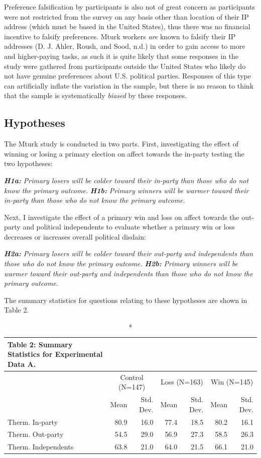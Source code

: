 \documentclass[
]{article}
\begin{document}
Preference falsification by participants is also not of great concern as participants were not restricted from the survey on any basis other than location of their IP address (which must be based in the United States), thus there was no financial incentive to falsify preferences. Mturk workers \emph{are} known to falsify their IP addresses (D. J. Ahler, Roush, and Sood, n.d.) in order to gain access to more and higher-paying tasks, as such it is quite likely that some responses in the study were gathered from participants outside the United States who likely do not have genuine preferences about U.S. political parties. Responses of this type can artificially inflate the variation in the sample, but there is no reason to think that the sample is systematically \emph{biased} by these responses.

\hypertarget{hypotheses}{%
\subsection{Hypotheses}\label{hypotheses}}

The Mturk study is conducted in two parts. First, investigating the effect of winning or losing a primary election on affect towards the in-party testing the two hypotheses:

\textbf{\emph{H1a:}} \emph{Primary losers will be colder toward their in-party than those who do not know the primary outcome.}
\textbf{\emph{H1b:}} \emph{Primary winners will be warmer toward their in-party than those who do not know the primary outcome.}

Next, I investigate the effect of a primary win and loss on affect towards the out-party and political independents to evaluate whether a primary win or loss decreases or increases overall political disdain:

\textbf{\emph{H2a:}} \emph{Primary losers will be colder toward their out-party and independents than those who do not know the primary outcome.}
\textbf{\emph{H2b:}} \emph{Primary winners will be warmer toward their out-party and independents than those who do not know the primary outcome.}

The summary statistics for questions relating to these hypotheses are shown in Table 2.

\captionsetup[table]{labelformat=empty,skip=1pt}
\begin{longtable}{lrrrrrr}
\caption*{
{\large \textbf{Table 2:} Summary Statistics for Experimental Data A.}
} \\ 
\toprule
 & \multicolumn{2}{c}{Control (N=147)} & \multicolumn{2}{c}{Loss (N=163)} & \multicolumn{2}{c}{Win (N=145)} \\ 
 \cmidrule(lr){2-3} \cmidrule(lr){4-5} \cmidrule(lr){6-7}
  & Mean & Std. Dev. & Mean  & Std. Dev.  & Mean   & Std. Dev.   \\ 
\midrule
Therm. In-party & 80.9 & 16.0 & 77.4 & 18.5 & 80.2 & 16.1 \\ 
Therm. Out-party & 54.5 & 29.0 & 56.9 & 27.3 & 58.5 & 26.3 \\ 
Therm. Independents & 63.8 & 21.0 & 64.0 & 21.5 & 66.1 & 21.0 \\ 
 \bottomrule
\end{longtable}
\end{document}
